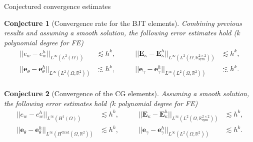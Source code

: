 \documentclass[aspectratio=169]{ISAE-Beamer}
\DeclareMathOperator*{\Grad}{Grad}
\newcommand{\bbR}{\mathbb{R}}
\newtheorem{conjecture}{Conjecture}
\begin{document}
\begin{frame}{Conjectured convergence estimates}

\begin{conjecture}[Convergence rate for the BJT elements]
	\setlength{\abovedisplayskip}{0pt}
	\setlength{\belowdisplayskip}{0pt}
	Combining previous results  and assuming a smooth solution, the following error estimates hold ($k$ polynomial degree for FE)
	\begin{equation*}
	\label{eq:errBEC}
	\begin{aligned}
	||e_w - e_w^h||_{L^{\infty}(L^2(\Omega))} &\lesssim h^{k}, \\
	||\bm{e}_\theta - \bm{e}_\theta^h||_{L^{\infty}(L^2(\Omega, \bbR^2))} &\lesssim h^{k}, \\
	\end{aligned} \qquad
	\begin{aligned}
	||\bm{E}_\kappa - \bm{E}_\kappa^h||_{L^{\infty}(L^2(\Omega, \bbR^{2\times 2}_{\text{sym}}))} &\lesssim  h^{k}, \\
	||\bm{e}_\gamma - \bm{e}_\gamma^ h||_{L^{\infty}(L^2(\Omega, \bbR^2))} &\lesssim  h^{k}. \\
	\end{aligned} 
	\end{equation*}
\end{conjecture}

\begin{conjecture}[Convergence of the CG elements]
\setlength{\abovedisplayskip}{0pt}
\setlength{\belowdisplayskip}{0pt}
	Assuming a smooth solution, the following error estimates hold ($k$ polynomial degree for FE)
	\begin{equation*}
	\label{eq:errCGDG}
	\begin{aligned}
	||e_w - e_w^h||_{L^{\infty}(H^1(\Omega))} &\lesssim h^{k}, \\
	||\bm{e}_\theta - \bm{e}_\theta^h||_{L^{\infty}(H^{\Grad}(\Omega, \bbR^2))} &\lesssim h^{k}, \\
	\end{aligned} \qquad
	\begin{aligned}
	||\bm{E}_\kappa - \bm{E}_\kappa^h||_{L^{\infty}(L^2(\Omega, \bbR^{2\times 2}_{\text{sym}}))} &\lesssim  h^{k}, \\
	||\bm{e}_\gamma - \bm{e}_\gamma^ h||_{L^{\infty}(L^2(\Omega, \bbR^2))} &\lesssim  h^{k}. \\
	\end{aligned} 
	\end{equation*}
	
\end{conjecture}
\end{frame}
\end{document}
